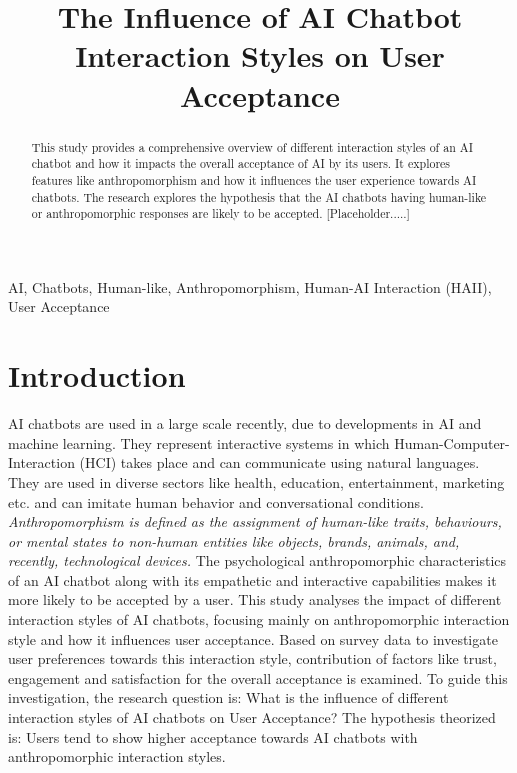 \documentclass[conference]{IEEEtran}
\begin{document}
\title{The Influence of AI Chatbot Interaction Styles on User Acceptance}

\author{
	}

\maketitle

\begin{abstract}
	This study provides a comprehensive overview of different interaction styles of an AI chatbot and how it impacts the overall acceptance of AI by its users. It explores features like anthropomorphism and how it influences the user experience towards AI chatbots. The research explores the hypothesis that the AI chatbots having human-like or anthropomorphic responses are likely to be accepted. [Placeholder.....]
\end{abstract}

\begin{IEEEkeywords}
	AI, Chatbots, Human-like, Anthropomorphism, Human-AI Interaction (HAII), User Acceptance
\end{IEEEkeywords}

\section{Introduction}
AI chatbots are used in a large scale recently, due to developments in AI and machine learning. They represent interactive systems in which Human-Computer-Interaction (HCI) takes place and can communicate using natural languages. They are used in diverse sectors like health, education, entertainment, marketing etc. and can imitate human behavior and conversational conditions\cite{b1}. \textit{Anthropomorphism is defined as the assignment of human-like traits, behaviours, or mental states to non-human entities like objects, brands, animals, and, recently, technological devices.} The psychological anthropomorphic characteristics of an AI chatbot along with its empathetic and interactive capabilities makes it more likely to be accepted by a user\cite{b2}. This study analyses the impact of different interaction styles of AI chatbots, focusing mainly on anthropomorphic interaction style and how it influences user acceptance. Based on survey data to investigate user preferences towards this interaction style, contribution of factors like trust, engagement and satisfaction for the overall acceptance is examined. To guide this investigation, the research question is: What is the influence of different interaction styles of AI chatbots on User Acceptance? The hypothesis theorized is: Users tend to show higher acceptance towards AI chatbots with anthropomorphic interaction styles.
\end{document}
